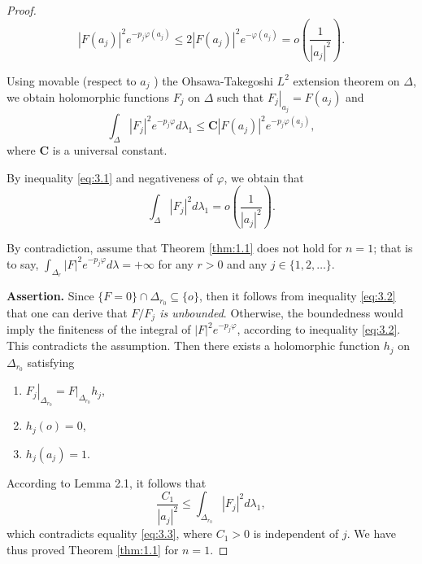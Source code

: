 \begin{proof}
\begin{equation}\label{eq:3.1}
    \left|F\left(a_j\right)\right|^2 e^{-p_j \varphi\left(a_j\right)} \leq 2\left|F\left(a_j\right)\right|^2 e^{-\varphi\left(a_j\right)}=o\left(\frac{1}{\left|a_j\right|^2}\right) .
\end{equation}


Using movable (respect to $a_j$ ) the Ohsawa-Takegoshi $L^2$ extension theorem on $\Delta$, we obtain holomorphic functions $F_j$ on $\Delta$ such that $\left.F_j\right|_{a_j}=F\left(a_j\right)$ and
\begin{equation}\label{eq:3.2}
    \int_{\Delta}\left|F_j\right|^2 e^{-p_j \varphi} d \lambda_1 \leq \mathbf{C}\left|F\left(a_j\right)\right|^2 e^{-p_j \varphi\left(a_j\right)},
\end{equation}
where $\mathbf{C}$ is a universal constant.

By inequality \eqref{eq:3.1} and negativeness of $\varphi$, we obtain that
\begin{equation}\label{eq:3.3}
    \int_{\Delta}\left|F_j\right|^2 d \lambda_1=o\left(\frac{1}{\left|a_j\right|^2}\right) .
\end{equation}

By contradiction, assume that Theorem \ref{thm:1.1} does not hold for $n=1$; that is to say, $\int_{\Delta_r}|F|^2 e^{-p_j \varphi} d \lambda=+\infty$ for any $r>0$ and any $j \in\{1,2, \ldots\}$.

\textbf{Assertion.} Since $\{F=0\} \cap \Delta_{r_0} \subseteq\{o\}$, then it follows from inequality \eqref{eq:3.2} that one can derive that \emph{$F / F_j$ is unbounded}. Otherwise, the boundedness would imply the finiteness of the integral of $|F|^2 e^{-p_j \varphi}$, according to inequality \eqref{eq:3.2}. This contradicts the assumption. Then there exists a holomorphic function $h_j$ on $\Delta_{r_0}$ satisfying
\begin{enumerate}[label=(\arabic*)]
    \item $\left.F_j\right|_{\Delta_{r_0}}=\left.F\right|_{\Delta_{r_0}} h_j$,
    \item $h_j(o)=0$,
    \item $h_j\left(a_j\right)=1$.
\end{enumerate}
According to Lemma 2.1, it follows that
$$
\frac{C_1}{\left|a_j\right|^2} \leq \int_{\Delta_{r_0}}\left|F_j\right|^2 d \lambda_1,
$$
which contradicts equality \eqref{eq:3.3}, where $C_1>0$ is independent of $j$.
We have thus proved Theorem \ref{thm:1.1} for $n=1$.


\end{proof}
